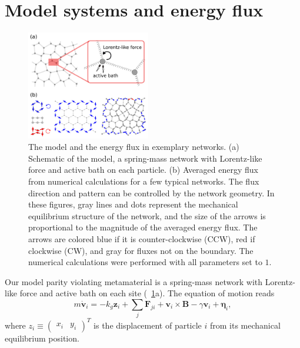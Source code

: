 \documentclass[
 preprint,
 preprintnumbers,
 amsmath,amssymb,
 aps,
 pre,
 longbibliography,
 superscriptaddress,
 10pt, twocolumn
]{revtex4-1}
\begin{document}
\section{Model systems and energy flux} \label{sec:model}

\begin{figure}[tbp]
	\centering
	\includegraphics[width=0.48\textwidth]{model_and_result.pdf}
    \caption{
    The model and the energy flux in exemplary networks.
    (a) Schematic of the model, a spring-mass network with Lorentz-like force and active bath on each particle.
    (b) Averaged energy flux from numerical calculations for a few typical networks. The flux direction and pattern can be controlled by the network geometry. In these figures, gray lines and dots represent the mechanical equilibrium structure of the network, and the size of the arrows is proportional to the magnitude of the averaged energy flux. The arrows are colored blue if it is counter-clockwise (CCW), red if clockwise (CW), and gray for fluxes not on the boundary. The numerical calculations were performed with all parameters set to $1$.
    }
    \label{fig:model_and_result}
\end{figure}

Our model parity violating metamaterial is a spring-mass network with Lorentz-like force and active bath \cite{Fodor2016HowFar} on each site (\figurename~\ref{fig:model_and_result}a).
The equation of motion reads
\begin{equation} \label{eqn:GLE_single}
    m\dot{\bm{v}}_i = -k_g \bm{z}_i + \sum_j\bm{F}_{ji} + \bm{v}_i\times\bm{B} - \gamma\bm{v}_i + \bm{\eta}_i ,
\end{equation}
where $z_i \equiv \begin{pmatrix} x_i & y_i \end{pmatrix}^T$ is the displacement of particle $i$ from its mechanical equilibrium position.
\end{document}
